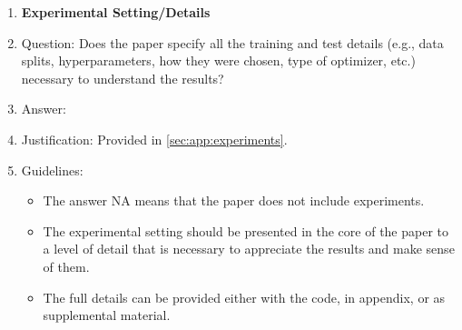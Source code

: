 \documentclass{article}
\theoremstyle{plain}
\theoremstyle{definition}
\theoremstyle{remark}
\theoremstyle{remark}
\begin{document}
\begin{enumerate}
\item {\bf Experimental Setting/Details}
    \item[] Question: Does the paper specify all the training and test details (e.g., data splits, hyperparameters, how they were chosen, type of optimizer, etc.) necessary to understand the results?
    \item[] Answer: \answerYes{} %
    \item[] Justification: Provided in \autoref{sec:app:experiments}.
    \item[] Guidelines:
    \begin{itemize}
        \item The answer NA means that the paper does not include experiments.
        \item The experimental setting should be presented in the core of the paper to a level of detail that is necessary to appreciate the results and make sense of them.
        \item The full details can be provided either with the code, in appendix, or as supplemental material.
    \end{itemize}


\end{enumerate}
\end{document}
